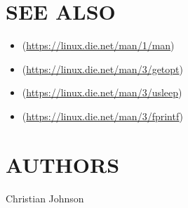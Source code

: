 \documentclass[11pt]{article}
\begin{document}
\section{SEE ALSO}
\label{sec:org37d3416}

\begin{itemize}
\item\relax [man(1)](\url{https://linux.die.net/man/1/man})
\item\relax [getopt(3)](\url{https://linux.die.net/man/3/getopt})
\item\relax [usleep(3)](\url{https://linux.die.net/man/3/usleep})
\item\relax [fprintf(3)](\url{https://linux.die.net/man/3/fprintf})
\end{itemize}
\section{AUTHORS}
\label{sec:orga34be85}

Christian Johnson
\end{document}
